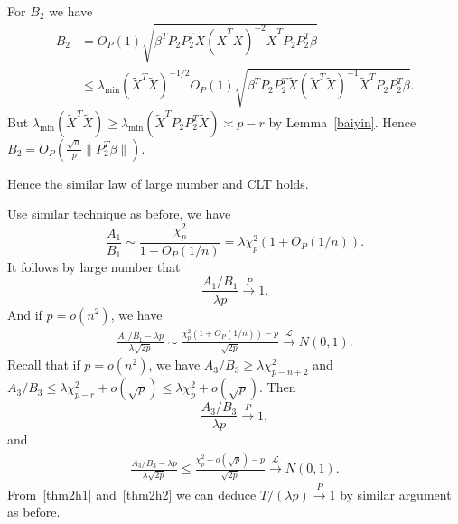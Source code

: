 \documentclass[review]{elsarticle}
\theoremstyle{plain}
\theoremstyle{definition}
\theoremstyle{remark}
\begin{document}
For $B_2$ we have
\begin{equation*}
    \begin{aligned}
    B_2&=O_P(1)\sqrt{\beta^T P_2 P_2^T \tilde{X}{(\tilde{X}^T\tilde{X})}^{-2}\tilde{X}^T P_2 P_2^T \beta}\\
    &\leq \lambda_{\min}{(\tilde{X}^T\tilde{X})}^{-1/2}O_P(1)\sqrt{\beta^T P_2 P_2^T \tilde{X}{(\tilde{X}^T\tilde{X})}^{-1}\tilde{X}^T P_2 P_2^T \beta}.
    \end{aligned}
\end{equation*}
But $\lambda_{\min}{(\tilde{X}^T\tilde{X})}\geq \lambda_{\min}{(\tilde{X}^T P_2 P_2^T \tilde{X})}\asymp p-r$ by Lemma~\ref{baiyin}.
Hence $B_2=O_P(\frac{\sqrt{n}}{p}\|P_2^T \beta\|)$.

Hence the similar law of large number and CLT holds.

Use similar technique as before, we have
\begin{equation*}
    \frac{A_1}{B_1}\sim \frac{\chi^2_p}{1+O_P(1/n)}= \lambda\chi^2_p (1+O_P(1/n)).
\end{equation*}
It follows by large number that
\begin{equation}\label{thm2h1}
    \frac{A_1/B_1}{\lambda p}\xrightarrow{P} 1.
\end{equation}
And if  $p=o(n^2)$, we have
\begin{equation}\label{thm2c1}
    \begin{aligned}
        \frac{A_1/B_1-\lambda p}{\lambda\sqrt{2p}}\sim \frac{\chi^2_p (1+O_P(1/n))-p}{\sqrt{2p}}\xrightarrow{\mathcal{L}} N(0,1).
    \end{aligned}
\end{equation}
Recall that if $p=o(n^2)$, we have $A_3/B_3\geq \lambda \chi^2_{p-n+2}$ and
$A_3/B_3\leq \lambda \chi^2_{p-r}+o(\sqrt{p})\leq \lambda \chi^2_{p}+o(\sqrt{p})$. Then
\begin{equation}\label{thm2h2}
    \frac{A_3/B_3}{\lambda p}\xrightarrow{P} 1,
\end{equation}
and
\begin{equation}\label{thm2c2}
    \begin{aligned}
        \frac{A_3/B_3-\lambda p}{\lambda\sqrt{2p}}\leq \frac{\chi^2_p +o(\sqrt{p})-p}{\sqrt{2p}}\xrightarrow{\mathcal{L}} N(0,1).
    \end{aligned}
\end{equation}
From~\eqref{thm2h1} and~\eqref{thm2h2} we can deduce $T/(\lambda p)\xrightarrow{P}1$ by similar argument as before.
\end{document}
